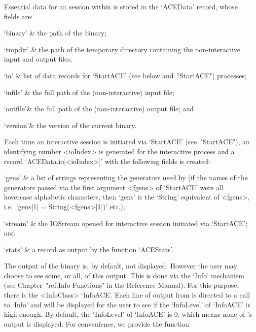 
Essential data for an {\ACE} session within {\GAP} is  stored  in  the
`ACEData'{\undoquotes{}}   record,
whose fields are:

\beginitems

\quad`binary' & the path of the {\ACE} binary;

\quad`tmpdir' & the path of the  temporary  directory  containing  the
non-interactive {\ACE} input and output files;

\quad`io'     & list  of  data  records  for  `StartACE'   (see  below 
and~"StartACE") processes;

\quad`infile' & the full path of the  (non-interactive)  {\ACE}  input
file;

\quad`outfile'& the full path of the (non-interactive)  {\ACE}  output
file; and

\quad`version'& the version of the current {\ACE} binary.

\enditems

Each time an interactive {\ACE} session is  initiated  via  `StartACE'
(see~"StartACE"), an identifying number <ioIndex> is generated for the
interactive process and  a  record  `ACEData.io[<ioIndex>]'  with  the
following fields is created:

\beginitems

\quad`gens'   & a list of strings representing the generators used  by
{\ACE} (if the names of the generators passed via the  first  argument
<fgens> of `StartACE' were all lowercase alphabetic  characters,  then
`gens'  is  the  `String'  equivalent  of  <fgens>,  i.e.~`gens[1]   =
String(<fgens>[1])' etc.);


\quad`stream' & the IOStream opened  for  interactive  {\ACE}  session
initiated via `StartACE'; and

\quad`stats'  & a record as output by the function `ACEStats'.

\enditems


The output of the {\ACE} binary is, by default, not displayed. However
the user may choose to see some, or all, of this output. This is  done
via the `Info' mechanism  (see  Chapter~"ref:Info  Functions"  in  the
{\GAP} Reference Manual). For this purpose, there is  the  <InfoClass>
`InfoACE'. Each line of output from {\ACE} is directed to  a  call  to
`Info' and will be displayed for the user to see if the `InfoLevel' of
`InfoACE' is high enough. By default, the `InfoLevel' of `InfoACE'  is
0, which means none of {\ACE}'s output is displayed. For  convenience,
we provide the function


